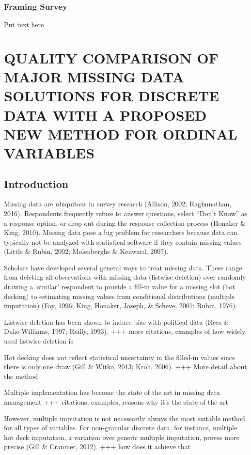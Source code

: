 \documentclass[12pt,econ]{sources/authesis}
\begin{document}
\hypertarget{ordblock-results-framing}{%
\subsection{Framing Survey}\label{ordblock-results-framing}}

Put text here

\hypertarget{ordmiss}{%
\chapter{QUALITY COMPARISON OF MAJOR MISSING DATA SOLUTIONS FOR DISCRETE DATA WITH A PROPOSED NEW METHOD FOR ORDINAL VARIABLES}\label{ordmiss}}

\hypertarget{ordmiss-intro}{%
\section{Introduction}\label{ordmiss-intro}}

Missing data are ubiquitous in survey research (Allison, 2002; Raghunathan, 2016). Respondents frequently refuse to answer questions, select ``Don't Know'' as a response option, or drop out during the response collection process (Honaker \& King, 2010). Missing data pose a big problem for researchers because data can typically not be analyzed with statistical software if they contain missing values (Little \& Rubin, 2002; Molenberghs \& Kenward, 2007).

Scholars have developed several general ways to treat missing data. These range from deleting all observations with missing data (listwise deletion) over randomly drawing a `similar' respondent to provide a fill-in value for a missing slot (hot decking) to estimating missing values from conditional distributions (multiple imputation) (Fay, 1996; King, Honaker, Joseph, \& Scheve, 2001; Rubin, 1976).

Listwise deletion has been shown to induce bias with political data (Rees \& Duke-Williams, 1997; Reilly, 1993). +++ more citations, examples of how widely used listwise deletion is

Hot decking does not reflect statistical uncertainty in the filled-in values since there is only one draw (Gill \& Witko, 2013; Kroh, 2006). +++ More detail about the method

Multiple implementation has become the state of the art in missing data management +++ citations, examples, reasons why it's the state of the art

However, multiple imputation is not necessarily always the most suitable method for all types of variables. For non-granular discrete data, for instance, multiple hot deck imputation, a variation over generic multiple imputation, proves more precise (Gill \& Cranmer, 2012). +++ how does it achieve that
\end{document}
